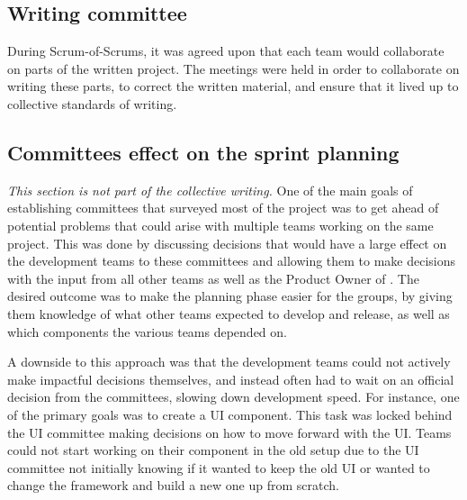\subsection{Writing committee}
During Scrum-of-Scrums, it was agreed upon that each team would collaborate on parts of the written project. The meetings were held in order to collaborate on writing these parts, to correct the written material, and ensure that it lived up to collective standards of writing.



\subsection{Committees effect on the sprint planning}
\textit{This section is not part of the collective writing.}
One of the main goals of establishing committees that surveyed most of the \knox{} project was to get ahead of potential problems that could arise with multiple teams working on the same project. 
This was done by discussing decisions that would have a large effect on the development teams to these committees and allowing them to make decisions with the input from all other  \knox{} teams as well as the Product Owner of \knox{}. 
The desired outcome was to make the planning phase easier for the groups, by giving them knowledge of what other teams expected to develop and release, as well as which components the various teams depended on.

A downside to this approach was that the development teams could not actively make impactful decisions themselves, and instead often had to wait on an official decision from the committees, slowing down development speed. 
For instance, one of the primary goals was to create a UI component. 
This task was locked behind the UI committee making decisions on how to move forward with the UI. 
Teams could not start working on their component in the old setup due to the UI committee not initially knowing if it wanted to keep the old UI or wanted to change the framework and build a new one up from scratch.


